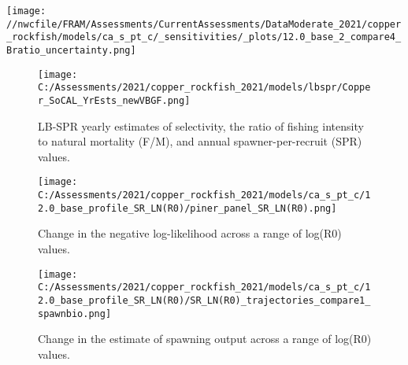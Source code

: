 \documentclass[11pt,
  english,
  a4paper,
]{article}
\begin{document}

\texttt{[image: //nwcfile/FRAM/Assessments/CurrentAssessments/DataModerate\_2021/copper\_rockfish/models/ca\_s\_pt\_c/\_sensitivities/\_plots/12.0\_base\_2\_compare4\_Bratio\_uncertainty.png]} \newpage

\tagmcend\tagstructend


\begin{figure}
\centering
\texttt{[image: C:/Assessments/2021/copper\_rockfish\_2021/models/lbspr/Copper\_SoCAL\_YrEsts\_newVBGF.png]}
\caption{LB-SPR yearly estimates of selectivity, the ratio of fishing intensity to natural mortality (F/M), and annual spawner-per-recruit (SPR) values.\label{fig:lbspr}}
\end{figure}

\tagmcend\tagstructend

\newpage


\begin{figure}
\centering
\texttt{[image: C:/Assessments/2021/copper\_rockfish\_2021/models/ca\_s\_pt\_c/12.0\_base\_profile\_SR\_LN(R0)/piner\_panel\_SR\_LN(R0).png]}
\caption{Change in the negative log-likelihood across a range of log(R0) values.\label{fig:r0-profile}}
\end{figure}

\tagmcend\tagstructend


\begin{figure}
\centering
\texttt{[image: C:/Assessments/2021/copper\_rockfish\_2021/models/ca\_s\_pt\_c/12.0\_base\_profile\_SR\_LN(R0)/SR\_LN(R0)\_trajectories\_compare1\_spawnbio.png]}
\caption{Change in the estimate of spawning output across a range of log(R0) values.\label{fig:r0-ssb}}
\end{figure}
\end{document}
